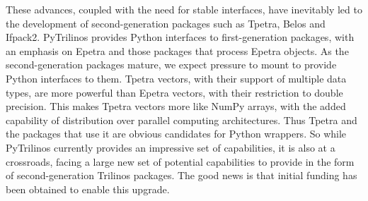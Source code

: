 \documentclass[11pt]{article}
\begin{document}
These advances, coupled with the need for stable interfaces, have inevitably led to the development of second-generation packages such as Tpetra, Belos and Ifpack2.  PyTrilinos provides Python interfaces to first-generation packages, with an emphasis on Epetra and those packages that process Epetra objects.  As the second-generation packages mature, we expect pressure to mount to provide Python interfaces to them.  Tpetra vectors, with their support of multiple data types, are more powerful than Epetra vectors, with their restriction to double precision.  This makes Tpetra vectors more like NumPy arrays, with the added capability of distribution over parallel computing architectures.  Thus Tpetra and the packages that use it are obvious candidates for Python wrappers.  So while PyTrilinos currently provides an impressive set of capabilities, it is also at a crossroads, facing a large new set of potential capabilities to provide in the form of second-generation Trilinos packages.  The good news is that initial funding has been obtained to enable this upgrade.



\end{document}
